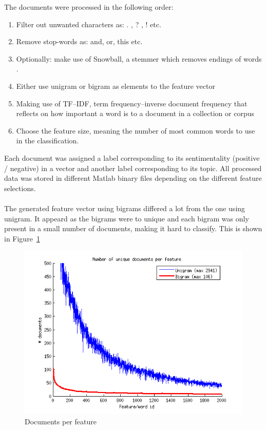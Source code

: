 The documents were processed in the following order:
\begin{enumerate}
\item Filter out unwanted characters as: . , ? , ! etc.
\item Remove stop-words as: and, or, this etc.
\item Optionally: make use of Snowball, a stemmer which removes endings of
words \citep{snowball_url}.
\item Either use unigram or bigram as elements to the feature vector
\item Making use of TF–IDF, term frequency–inverse document frequency that
reflects on how important a word is to a document in a collection or corpus
\item Choose the feature size, meaning the number of most common words to use
 in the classification.
\end{enumerate}
Each document was assigned a label corresponding to its sentimentality
(positive / negative) in a vector and another label corresponding to its topic.
All processed data was stored in different Matlab binary files depending on the
different feature selections.
\\\\
The generated feature vector using bigrams differed a lot from the one using
unigram. It appeard as the bigrams were to unique and each bigram was only
present in a small number of documents, making it hard to classify. This is
shown in Figure~\ref{fig:docperfeature}
\begin{figure}[h!]
\centering
        \includegraphics[scale = 0.6]{../Plottar/documents_per_feature.png}
\caption{Documents per feature}
\label{fig:docperfeature}
\end{figure}

